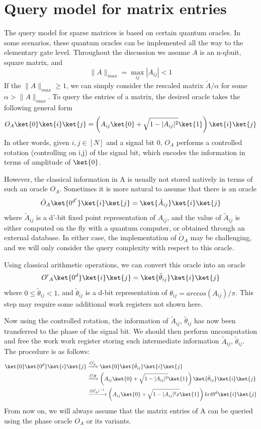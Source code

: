 \documentclass[12pt, oneside]{book}
\theoremstyle{definition}
\theoremstyle{definition}
\theoremstyle{remark}
\begin{document}
\section{Query model for matrix entries}
The query model for sparse matrices is based on certain quantum oracles. In some scenarios, these quantum oracles can be implemented all the way to the elementary gate level. Throughout the discussion we assume $A$ is an n-qbuit, square matrix, and 
\[
\|A\|_{max}=\max_{ij}|A_{ij}|<1
\]
If the $\|A\|_{max}\geq 1$, we can simply consider the rescaled matrix $\tilde{A}/\alpha$ for some $\alpha>\|A\|_{max}$. To query the entries of a matrix, the desired oracle takes the following general form
\[
O_A\ket{0}\ket{i}\ket{j}=\left(A_{ij}\ket{0}+\sqrt{1-|A_{ij}|^2}\ket{1}\right)\ket{i}\ket{j}
\]
In other words, given $i,j\in[N]$ and a signal bit $0$, $O_A$ performs a controlled rotation (controlling on i,j) of the signal bit, which encodes the information in terms of amplitude of $\ket{0}$.

However, the classical information in A is usually not stored natively in terms of such an oracle $O_A$. Sometimes it is more natural to assume that there is an oracle
\[
\tilde{O}_A\ket{0^{d'}}\ket{i}\ket{j}=\ket{\tilde{A}_{ij}}\ket{i}\ket{j}
\]
where $\tilde{A}_{ij}$ is a d'-bit fixed point representation of $A_{ij}$, and the value of $\tilde{A}_{ij}$ is either computed on the fly with a quantum computer, or obtained through an external database. In either case, the implementation of $\tilde{O}_A$ may be challenging, and we will only consider the query complexity with respect to this oracle.

Using classical arithmetic operations, we can convert this oracle into an oracle
\[
{O'}_A\ket{0^d}\ket{i}\ket{j}=\ket{\tilde{\theta}_{ij}}\ket{i}\ket{j}
\]
where $0\leq \tilde{\theta}_{ij}<1$, and $\tilde{\theta}_{ij}$ is a d-bit representation of $\theta_{ij}=arccos(A_{ij})/\pi$. This step may require some additional work registers not shown here.

Now using the controlled rotation, the information of $\tilde{A}_{ij}$, $\tilde{\theta}_{ij}$ has now been transferred to the phase of the signal bit. We should then perform uncomputation and free the work work register storing such intermediate information $\tilde{A}_{ij}$, $\tilde{\theta}_{ij}$. The procedure is as follows:
\begin{align*}
\ket{0}\ket{0^d}\ket{i}\ket{j}&\xrightarrow{O'_A}\ket{0}\ket{\tilde{\theta}_{ij}}\ket{i}\ket{j}\\
&\xrightarrow{CR}\left(A_{ij}\ket{0}+\sqrt{1-|A_{ij}|^2}\ket{1}\right)\ket{\tilde{\theta}_{ij}}\ket{i}\ket{j}\\
&\xrightarrow{(O'_A)^{-1}}\left(A_{ij}\ket{0}+\sqrt{1-|A_{ij}|^2x}\ket{1}\right)ket{0^d}\ket{i}\ket{j}
\end{align*}
From now on, we will always assume that the matrix entries of A can be queried using the phase oracle $O_A$ or its variants.
\end{document}
